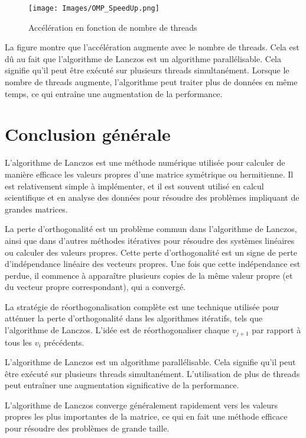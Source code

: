 \documentclass[11pt,french]{article}
\begin{document}
    \begin{figure}[h]
    \centering
    \texttt{[image: Images/OMP\_SpeedUp.png]}
    \caption{Accélération en fonction de nombre de threads}
    \label{fig:mesh1}
    \end{figure}
    \FloatBarrier
    
    La figure montre que l'accélération augmente avec le nombre de threads. Cela est dû au fait que l'algorithme de Lanczos est un algorithme parallélisable. Cela signifie qu'il peut être exécuté sur plusieurs threads simultanément. Lorsque le nombre de threads augmente, l'algorithme peut traiter plus de données en même temps, ce qui entraîne une augmentation de la performance.
    \FloatBarrier
    
	\newpage
	\section{Conclusion générale}
	L'algorithme de Lanczos est une méthode numérique utilisée pour calculer de manière efficace les valeurs propres d'une matrice symétrique ou hermitienne. Il est relativement simple à implémenter, et il est souvent utilisé en calcul scientifique et en analyse des données pour résoudre des problèmes impliquant de grandes matrices.

    La perte d'orthogonalité est un problème commun dans l'algorithme de Lanczos, ainsi que dans d'autres méthodes itératives pour résoudre des systèmes linéaires ou calculer des valeurs propres. Cette perte d’orthogonalité est un signe de perte d’indépendance linéaire des vecteurs propres. Une fois que cette indépendance est perdue, il commence à apparaître plusieurs copies de la même valeur propre (et du vecteur propre correspondant), qui a convergé.

    La stratégie de réorthogonalisation complète est une technique utilisée pour atténuer la perte d'orthogonalité dans les algorithmes itératifs, tels que l'algorithme de Lanczos. L'idée est de réorthogonaliser chaque $v_{j+1}$ par rapport à tous les $v_i$ précédents.

    L'algorithme de Lanczos est un algorithme parallélisable. Cela signifie qu'il peut être exécuté sur plusieurs threads simultanément. L'utilisation de plus de threads peut entraîner une augmentation significative de la performance.
     
     L'algorithme de Lanczos converge généralement rapidement vers les valeurs propres les plus importantes de la matrice, ce qui en fait une méthode efficace pour résoudre des problèmes de grande taille.
\end{document}
